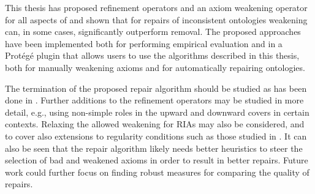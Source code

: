 
This thesis has proposed refinement operators and an axiom weakening operator for all aspects of \SROIQ and shown that for repairs of inconsistent ontologies weakening can, in some cases, significantly outperform removal. The proposed approaches have been implemented both for performing empirical evaluation and in a Protégé plugin that allows users to use the algorithms described in this thesis, both for manually weakening axioms and for automatically repairing ontologies.

The termination of the proposed repair algorithm should be studied as has been done in \cite{confalonieri2020towards}. Further additions to the refinement operators may be studied in more detail, e.g., using non-simple roles in the upward and downward covers in certain contexts. Relaxing the allowed weakening for RIAs may also be considered, and to cover also extensions to regularity conditions such as those studied in \cite{DBLP:conf/cade/Kazakov10}. It can also be seen that the repair algorithm likely needs better heuristics to steer the selection of bad and weakened axioms in order to result in better repairs. Future work could further focus on finding robust measures for comparing the quality of repairs.


